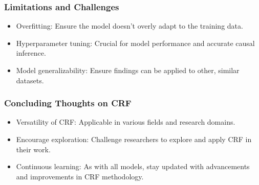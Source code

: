 \documentclass{beamer}
\begin{document}
\begin{frame}
\frametitle{Limitations and Challenges}
\begin{itemize}
    \item Overfitting: Ensure the model doesn't overly adapt to the training data.
    \item Hyperparameter tuning: Crucial for model performance and accurate causal inference.
    \item Model generalizability: Ensure findings can be applied to other, similar datasets.
\end{itemize}
\end{frame}

\begin{frame}
\frametitle{Concluding Thoughts on CRF}
\begin{itemize}
    \item Versatility of CRF: Applicable in various fields and research domains.
    \item Encourage exploration: Challenge researchers to explore and apply CRF in their work.
    \item Continuous learning: As with all models, stay updated with advancements and improvements in CRF methodology.
\end{itemize}
\end{frame}
\end{document}
